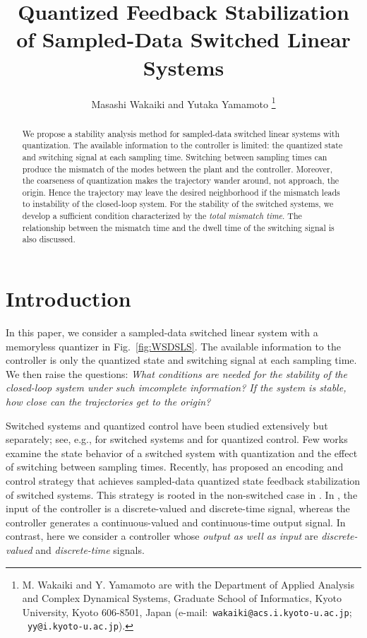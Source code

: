 \documentclass[a4, 11pt]{article}
\title{
Quantized Feedback Stabilization of Sampled-Data Switched Linear Systems
}
\author{Masashi Wakaiki and Yutaka Yamamoto
\thanks{M. Wakaiki and Y. Yamamoto are with the Department of Applied Analysis and Complex
Dynamical Systems, Graduate School of Informatics, Kyoto University, Kyoto
606-8501, Japan
(e-mail:{\tt  \ wakaiki@acs.i.kyoto-u.ac.jp};
{\tt \ yy@i.kyoto-u.ac.jp}).}}
\begin{document}
\maketitle
\thispagestyle{empty}
\pagestyle{empty}

\begin{abstract}                We propose a stability analysis method for sampled-data switched linear
systems with quantization.
The available information to the controller
is limited: the quantized state and switching signal at
each sampling time.
Switching between sampling times can produce
the mismatch of the modes between the plant and the controller.
Moreover, the coarseness of quantization makes the trajectory wander
around, not approach, the origin.
Hence the trajectory may leave the desired neighborhood
if the mismatch leads to instability of the closed-loop system.
For the stability of the switched systems,
we develop a sufficient condition characterized by the {\em total mismatch time}.
The relationship between the mismatch time and the dwell time 
of the switching signal is also discussed.
\end{abstract}



\section{Introduction}
In this paper, we consider a
sampled-data switched linear system with a memoryless quantizer 
in Fig.~\ref{fig:WSDSLS}.
The available information to the controller is only
the quantized state and switching signal at each sampling time.
We then raise the questions:
{\em
What conditions are needed for the stability of the closed-loop system
under such imcomplete information?
If the system is stable, how close can the trajectories get to the origin?}

Switched systems and quantized control have been studied extensively but separately;
see, e.g., \cite{Liberzon2003Book, Lin2009} for switched systems
and \cite{Ishii2002Book, Nair2007} for quantized control.
Few works examine 
the state behavior of a switched system with quantization and
the effect of switching between sampling times. 
Recently, \cite{Liberzon2014} has proposed an
encoding and control strategy that achieves
sampled-data quantized state feedback stabilization of switched systems.
This strategy is rooted in
the non-switched case in \cite{Liberzon2003}.
In \cite{Liberzon2014}, the input of the controller is a
discrete-valued and discrete-time signal, whereas
the controller generates 
a continuous-valued and continuous-time output signal.
In contrast, here we consider a controller whose {\em output as well as input} are
{\em discrete-valued} and {\em discrete-time} signals.
\end{document}
